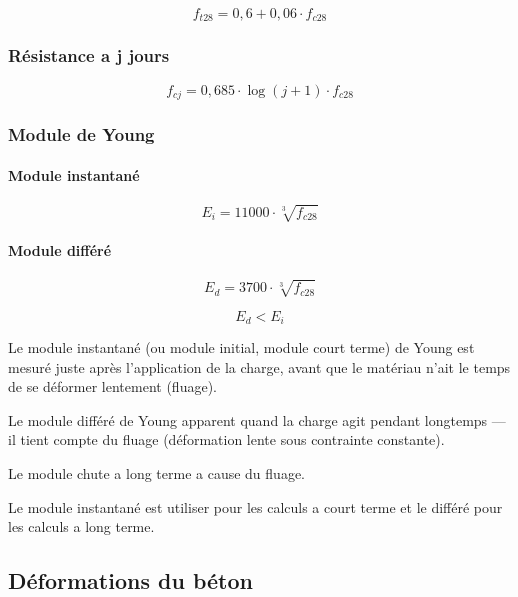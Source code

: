 \documentclass[12pt,a4paper]{article}
\begin{document}
	\[ f_{t28} = 0,6 + 0,06 \cdot f_{c28} \]
	
	\subsubsection{Résistance a j jours}
	
	\[ f_{cj} = 0,685 \cdot \log(j+1) \cdot f_{c28} \]
	
	\subsubsection{Module de Young}
	
	\paragraph{Module instantané}
	
	\[ E_{i} = 11000 \cdot \sqrt[3]{f_{c28}} \]
	
	\paragraph{Module différé} 
	
	\[ E_{d} = 3700 \cdot \sqrt[3]{f_{c28}} \]
	
	
	\[ E_{d} < E_{i} \]
	
	
	\begin{tcolorbox}[colback=gray!20, colframe=black, title=Remarque]
		Le module instantané (ou module initial, module court terme) de Young est mesuré juste après l’application de la charge,
		avant que le matériau n’ait le temps de se déformer lentement (fluage).
		
		\vspace{\baselineskip}
		
		Le module différé de Young apparent quand la charge agit pendant longtemps — il tient compte du fluage (déformation lente sous contrainte constante).
		
		\vspace{2\baselineskip}
		
		Le module chute a long terme a cause du fluage.
		
		\vspace{\baselineskip}
		
		Le module instantané est utiliser pour les calculs a court terme et le différé pour les calculs a long terme.
		
	\end{tcolorbox}
	
	
	\subsection{Déformations du béton}
	
\end{document}
